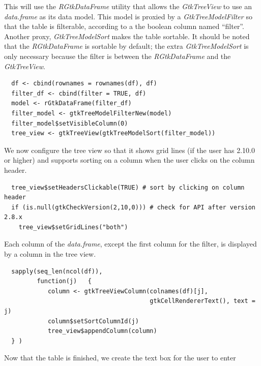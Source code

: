 \documentclass[article]{jss}
\begin{document}
%
This will use the \emph{RGtkDataFrame} utility that allows
the \emph{GtkTreeView} to use an 
\emph{data.frame} as its data model. This model is proxied by a \emph{GtkTreeModelFilter}
so that the table is filterable, according to
a the boolean column named ``filter''. Another proxy, \emph{GtkTreeModelSort}
makes the table sortable. It should be
noted that the \emph{RGtkDataFrame} is sortable by default; the extra 
\emph{GtkTreeModelSort} is only necessary because the filter is between the
\emph{RGtkDataFrame} and the \emph{GtkTreeView}.
\begin{verbatim}
  df <- cbind(rownames = rownames(df), df)
  filter_df <- cbind(filter = TRUE, df)
  model <- rGtkDataFrame(filter_df)
  filter_model <- gtkTreeModelFilterNew(model)
  filter_model$setVisibleColumn(0)
  tree_view <- gtkTreeView(gtkTreeModelSort(filter_model))
\end{verbatim}
We now configure the tree view so that it shows grid lines (if the user
has  2.10.0 or higher) and supports sorting on a column when
the user clicks on the column header.
\begin{verbatim}
  tree_view$setHeadersClickable(TRUE) # sort by clicking on column header
  if (is.null(gtkCheckVersion(2,10,0))) # check for API after version 2.8.x
    tree_view$setGridLines("both")
\end{verbatim}
Each column of the \emph{data.frame}, except the first column for the filter,
is displayed by a column in the tree view.
\begin{verbatim}
  sapply(seq_len(ncol(df)),
         function(j)   {
            column <- gtkTreeViewColumn(colnames(df)[j], 
                                        gtkCellRendererText(), text = j)
            column$setSortColumnId(j)
            tree_view$appendColumn(column)
  } )

\end{verbatim}
Now that the table is finished, we create the text box for the user to enter
\end{document}
